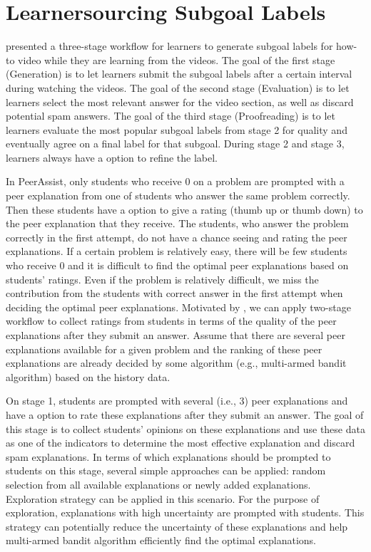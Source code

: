\documentclass{article}
\begin{document}
\section{Learnersourcing Subgoal Labels}
\cite{Weir2015-hg} presented a three-stage workflow for learners to generate
subgoal labels for how-to video while they are learning from the
videos. The goal of the first stage (Generation) is to let learners submit the
subgoal labels after a certain interval during watching the
videos. The goal of the second stage (Evaluation) is to let learners select the
most relevant answer for the video section, as well as discard
potential spam answers. The goal of the third stage (Proofreading) is
to let learners evaluate the most popular subgoal labels from stage 2
for quality and eventually agree on a final label for that
subgoal. During stage 2 and stage 3, learners always have a option to
refine the label.

In PeerAssist, only students who receive 0 on a problem are
prompted with a peer explanation from one of students who answer the same
problem correctly. Then these students have a option to give a rating
(thumb up or thumb down) to the peer explanation that they
receive. The students, who answer the problem correctly in the first
attempt, do not have a chance seeing and rating the peer
explanations. If
a certain problem is relatively easy, there will be few students who
receive 0 and it is difficult to find the optimal peer explanations
based on students' ratings. Even if the problem is relatively
difficult, we miss the contribution from the students with correct
answer in the first attempt when deciding the optimal peer
explanations. Motivated by \cite{Weir2015-hg}, we can apply two-stage
workflow to collect ratings from students in terms of the quality of
the peer explanations after they submit an answer. Assume that there
are several peer explanations available for a given problem and the
ranking of these peer explanations are already decided by some
algorithm (e.g., multi-armed bandit algorithm) based on the history data.

On stage 1, students are prompted with several (i.e., 3) peer
explanations and have a option to rate these explanations after they
submit an answer. The goal of this stage is to collect students'
opinions on these explanations and use these data as one of the
indicators to determine the most effective explanation and discard
spam explanations. In terms of
which explanations should be prompted to students on this stage,
several simple approaches can be applied: random selection from all
available explanations or newly added explanations. Exploration strategy can be applied in this scenario. For the purpose of
exploration, explanations with high uncertainty are prompted with
students. This strategy can potentially reduce the uncertainty of
these explanations and help multi-armed bandit algorithm efficiently
find the optimal explanations.
\end{document}
